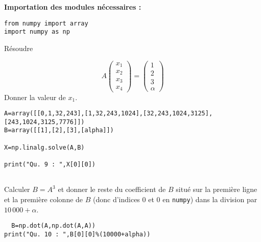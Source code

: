 \textbf{Importation des modules nécessaires : }


\begin{lstlisting}
from numpy import array
import numpy as np
\end{lstlisting}


\question{} Résoudre

  \begin{equation*}
    A
    \begin{pmatrix}
      x_{1}\\x_{2}\\x_{3}\\x_{4}
    \end{pmatrix}
    =
    \begin{pmatrix}
      1\\ 2\\ 3\\ \alpha
    \end{pmatrix}
  \end{equation*}
  Donner la valeur de $x_{1}$.
  
  
\begin{lstlisting}
A=array([[0,1,32,243],[1,32,243,1024],[32,243,1024,3125],[243,1024,3125,7776]])
B=array([[1],[2],[3],[alpha]])

X=np.linalg.solve(A,B)

print("Qu. 9 : ",X[0][0])


\end{lstlisting}


\question{}
  Calculer $B = A^{3}$ et donner le reste du coefficient de $B$ situé
  sur la première ligne et la première colonne de $B$ (donc d'indices
  $0$ et $0$ en \texttt{numpy}) dans la division par $10\,000+\alpha$.

\begin{lstlisting}  
  B=np.dot(A,np.dot(A,A))
print("Qu. 10 : ",B[0][0]%(10000+alpha))
\end{lstlisting}
